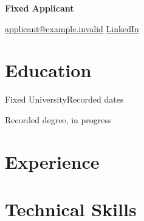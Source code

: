 \documentclass[10pt,a4paper]{article}
\begin{document}
{\Large\bfseries Fixed Applicant}\par
\href{mailto:applicant@example.invalid}{applicant@example.invalid}
\enspace\textbar{}\enspace
\href{https://example.invalid/profile}{LinkedIn}\par
\begingroup\large\bfseries
\endgroup
\section*{Education}
Fixed University\hfill Recorded dates\par
Recorded degree, in progress\par
\section*{Experience}
\section*{Technical Skills}
\end{document}
